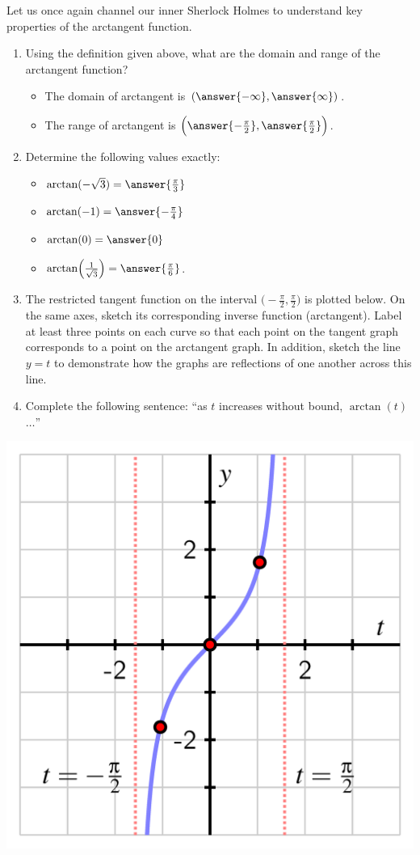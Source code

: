 \documentclass{ximera}
\begin{document}
\begin{problem}
Let us once again channel our inner Sherlock Holmes to understand key properties of the arctangent function.%
\par
\begin{enumerate}
\item Using the definition given above, what are the domain and range of the arctangent function?
%
\begin{itemize}
\item The domain of arctangent is $(\answer{-\infty} , \answer{\infty})$.
%
\item The range of arctangent is $\Big(\answer{-\frac{\pi}{2}} , \answer{\frac{\pi}{2}} \Big)$.
\end{itemize}
%
\item Determine the following values exactly: 
\begin{itemize}
\item $\arctan(-\sqrt{3}) = \answer{\frac{\pi}{3}}$
%
\item $\arctan(-1) = \answer{-\frac{\pi}{4}}$
%
\item $\arctan(0) = \answer{0}$
%
\item $\arctan\!\Big(\frac{1}{\sqrt{3}}\Big) = \answer{\frac{\pi}{6}}$.
\end{itemize}
%
\item The restricted tangent function on the interval $\Big(\!-\frac{\pi}{2}, \frac{\pi}{2}\Big)$ is plotted below. On the same axes, sketch its corresponding inverse function (arctangent).  Label at least three points on each curve so that each point on the tangent graph corresponds to a point on the arctangent graph. In addition, sketch the line $y = t$ to demonstrate how the graphs are reflections of one another across this line.%
%
\item Complete the following sentence:  ``as $t$ increases without bound, $\arctan(t)$ $\ldots$'' %
\end{enumerate}
\begin{image}
\includegraphics[width=0.8\linewidth]{inverse-tan-graph.png}

\end{image}
\end{problem}
\end{document}
